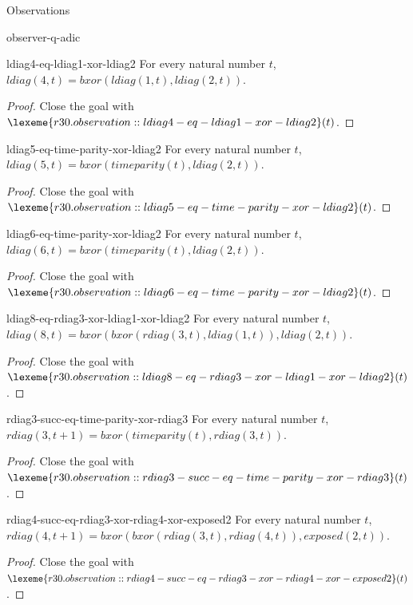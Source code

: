 \begin{lexlean}{Observations}
\begin{section}{observer-q-adic}
\begin{theorem}{ldiag4-eq-ldiag1-xor-ldiag2}
For every natural number \(t\), \(ldiag(4, t) = bxor(ldiag(1, t), ldiag(2, t))\).
\begin{proof}
Close the goal with \(\lexeme{r30.observation::ldiag4-eq-ldiag1-xor-ldiag2}(t)\).
\end{proof}
\end{theorem}

\begin{theorem}{ldiag5-eq-time-parity-xor-ldiag2}
For every natural number \(t\), \(ldiag(5, t) = bxor(timeparity(t), ldiag(2, t))\).
\begin{proof}
Close the goal with \(\lexeme{r30.observation::ldiag5-eq-time-parity-xor-ldiag2}(t)\).
\end{proof}
\end{theorem}

\begin{theorem}{ldiag6-eq-time-parity-xor-ldiag2}
For every natural number \(t\), \(ldiag(6, t) = bxor(timeparity(t), ldiag(2, t))\).
\begin{proof}
Close the goal with \(\lexeme{r30.observation::ldiag6-eq-time-parity-xor-ldiag2}(t)\).
\end{proof}
\end{theorem}

\begin{theorem}{ldiag8-eq-rdiag3-xor-ldiag1-xor-ldiag2}
For every natural number \(t\), \(ldiag(8, t) = bxor(bxor(rdiag(3, t), ldiag(1, t)), ldiag(2, t))\).
\begin{proof}
Close the goal with \(\lexeme{r30.observation::ldiag8-eq-rdiag3-xor-ldiag1-xor-ldiag2}(t)\).
\end{proof}
\end{theorem}

\begin{theorem}{rdiag3-succ-eq-time-parity-xor-rdiag3}
For every natural number \(t\), \(rdiag(3, t + 1) = bxor(timeparity(t), rdiag(3, t))\).
\begin{proof}
Close the goal with \(\lexeme{r30.observation::rdiag3-succ-eq-time-parity-xor-rdiag3}(t)\).
\end{proof}
\end{theorem}

\begin{theorem}{rdiag4-succ-eq-rdiag3-xor-rdiag4-xor-exposed2}
For every natural number \(t\), \(rdiag(4, t + 1) = bxor(bxor(rdiag(3, t), rdiag(4, t)), exposed(2, t))\).
\begin{proof}
Close the goal with \(\lexeme{r30.observation::rdiag4-succ-eq-rdiag3-xor-rdiag4-xor-exposed2}(t)\).
\end{proof}
\end{theorem}


\end{section}
\end{lexlean}
